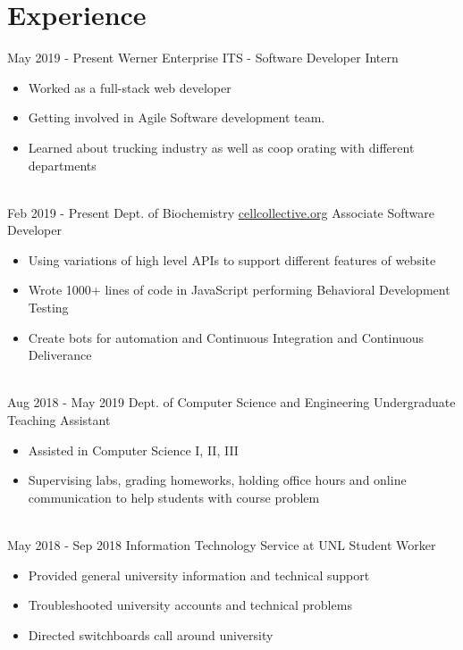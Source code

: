 \documentclass[letterpaper]{twentysecondcv} %
\begin{document}
\makeprofile %

\section{Experience}



\begin{twenty} %
\twentyitem
    	{May 2019 -}
    	{Present}
        {Werner Enterprise}
        {}
        {ITS - Software Developer Intern}
        {\begin{itemize}
            \item Worked as a full-stack web developer
            \item Getting involved in Agile Software development team. 
            \item Learned about trucking industry as well as coop orating with different departments
        \end{itemize}
        }
        \\
\twentyitem
    	{Feb 2019 -}
    	{Present}
        {Dept. of Biochemistry}
        {\href{https://cellcollective.org/}{cellcollective.org}}
        {Associate Software Developer}
        {\begin{itemize}
            \item Using variations of high level APIs to support different features of website
            \item Wrote 1000+ lines of code in JavaScript performing Behavioral Development Testing
            \item Create bots for automation and Continuous Integration and Continuous Deliverance
        \end{itemize}
        }
        \\
\twentyitem
    	{Aug 2018 -}
		{May 2019}
        {Dept. of Computer Science and Engineering}
        {}
        {Undergraduate Teaching Assistant}
        {\begin{itemize}
        \item Assisted in Computer Science I, II, III
        \item Supervising labs, grading homeworks, holding office hours and online communication to help students with course problem
        \end{itemize}
        }
        \\
\twentyitem
	{May 2018 -}
	{Sep 2018}
    {Information Technology Service at UNL}
    {}
    {Student Worker}
    {
    {\begin{itemize}
    \item Provided general university information and technical support
    \item Troubleshooted university accounts and technical problems
    \item Directed switchboards call around university
    \end{itemize}}
    }
    

\end{twenty}
\end{document}
